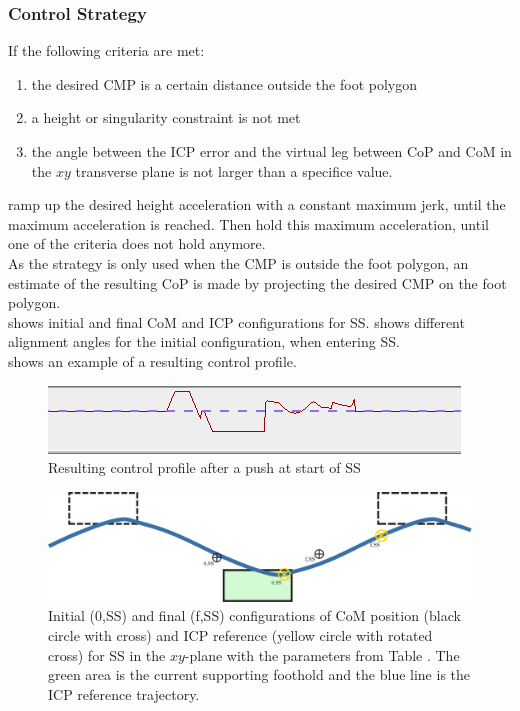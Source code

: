 \subsubsection{Control Strategy}
If the following criteria are met:
\begin{enumerate}
	\item the desired \ac{CMP} is a certain distance outside the foot polygon
	\item a height or singularity constraint is not met
	\item the angle between the ICP error and the virtual leg between \ac{CoP} and \ac{CoM} in the $xy$ transverse plane is not larger than a specifice value.
\end{enumerate}
ramp up the desired height acceleration with a constant maximum jerk, until the maximum acceleration is reached. Then hold this maximum acceleration, until one of the criteria does not hold anymore. \\
As the strategy is only used when the \ac{CMP} is outside the foot polygon, an estimate of the resulting \ac{CoP} is made by projecting the desired \ac{CMP} on the foot polygon.\\
 shows initial and final \ac{CoM} and \ac{ICP} configurations for \ac{SS}.  shows different alignment angles for the initial configuration, when entering \ac{SS}.\\
 shows an example of a resulting control profile.

\begin{figure}[h]
\centering
  \includegraphics[width=.8\linewidth]{STYLESTUFF/controlProfileConditional.png}
   \caption{Resulting control profile after a push at start of \ac{SS}}
    \label{fig:profile}
\end{figure}

\begin{figure}[h]
\centering
  \includegraphics[width=.8\linewidth]{STYLESTUFF/ICPplan3StepComICPrSS.png}
   \caption{Initial (0,SS) and final (f,SS) configurations of \ac{CoM} position (black circle with cross) and \ac{ICP} reference (yellow circle with rotated cross) for \ac{SS} in the $xy$-plane with the parameters from Table . The green area is the current supporting foothold and the blue line is the \ac{ICP} reference trajectory.}
    \label{fig:3foot}
\end{figure}


